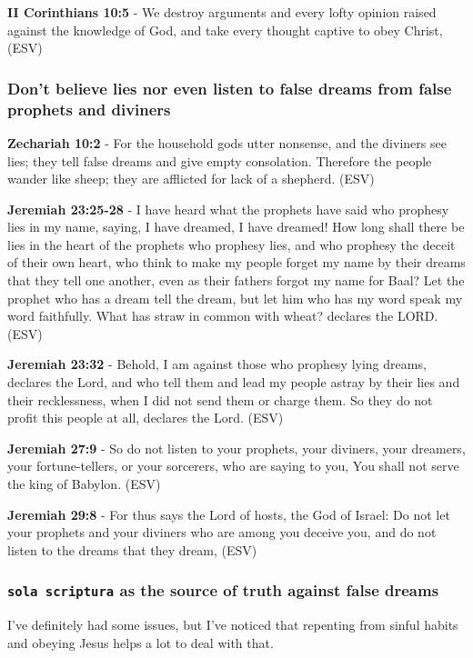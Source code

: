 \documentclass[11pt]{article}
\begin{document}
\textbf{II Corinthians 10:5} - We destroy arguments and every lofty opinion raised against the knowledge of God, and take every thought captive to obey Christ, (ESV)

\subsubsection{Don't believe lies nor even listen to false dreams from false prophets and diviners}
\label{sec:org818e878}
\textbf{Zechariah 10:2} - For the household gods utter nonsense, and the diviners see lies; they tell false dreams and give empty consolation. Therefore the people wander like sheep; they are afflicted for lack of a shepherd. (ESV)

\textbf{Jeremiah 23:25-28} -  I have heard what the prophets have said who prophesy lies in my name, saying, I have dreamed, I have dreamed! How long shall there be lies in the heart of the prophets who prophesy lies, and who prophesy the deceit of their own heart, who think to make my people forget my name by their dreams that they tell one another, even as their fathers forgot my name for Baal?  Let the prophet who has a dream tell the dream, but let him who has my word speak my word faithfully.  What has straw in common with wheat?  declares the LORD.  (ESV)

\textbf{Jeremiah 23:32} - Behold, I am against those who prophesy lying dreams, declares the Lord, and who tell them and lead my people astray by their lies and their recklessness, when I did not send them or charge them. So they do not profit this people at all, declares the Lord. (ESV)

\textbf{Jeremiah 27:9} - So do not listen to your prophets, your diviners, your dreamers, your fortune-tellers, or your sorcerers, who are saying to you, You shall not serve the king of Babylon. (ESV)

\textbf{Jeremiah 29:8} - For thus says the Lord of hosts, the God of Israel: Do not let your prophets and your diviners who are among you deceive you, and do not listen to the dreams that they dream, (ESV)

\subsubsection{\texttt{sola scriptura} as the source of truth against false dreams}
\label{sec:org86c749a}
I've definitely had some issues, but I've noticed that repenting from sinful habits and obeying Jesus helps a lot to deal with that.
\end{document}

